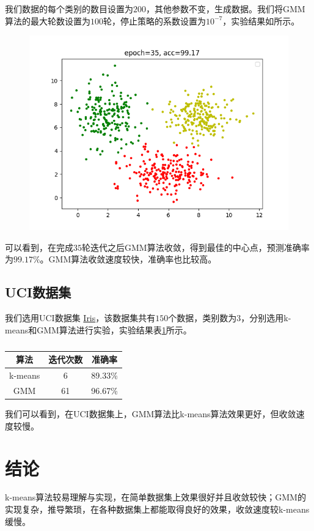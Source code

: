 \documentclass[lang=cn,11pt,a4paper,cite=authoryear]{elegantpaper}
\begin{document}
我们数据的每个类别的数目设置为$200$，其他参数不变，生成数据。我们将GMM算法的最大轮数设置为$100$轮，停止策略的系数设置为$10^{-7}$，实验结果如所示。

\begin{figure}[h]
	\centering
	\includegraphics[width=0.7\linewidth]{images/ml_lab3_3.png}
	\caption{}
	\label{fig:mllab33}
\end{figure}

可以看到，在完成$35$轮迭代之后GMM算法收敛，得到最佳的中心点，预测准确率为$99.17\%$。GMM算法收敛速度较快，准确率也比较高。

\subsection{UCI数据集}

我们选用UCI数据集 \href{http://archive.ics.uci.edu/ml/datasets/Iris}{Iris}，该数据集共有$150$个数据，类别数为$3$，分别选用k-means和GMM算法进行实验，实验结果表\ref{table:1}所示。

\begin{table}[h]
	\centering
	\begin{tabular}{ccc}
		\textbf{算法} & \textbf{迭代次数} & \textbf{准确率} \\ \hline
		k-means & 6 & 89.33\% \\
		GMM & 61 & 96.67\%
	\end{tabular}
	\caption{}
	\label{table:1}
\end{table}

我们可以看到，在UCI数据集上，GMM算法比k-means算法效果更好，但收敛速度较慢。


\section{结论}

k-means算法较易理解与实现，在简单数据集上效果很好并且收敛较快；GMM的实现复杂，推导繁琐，在各种数据集上都能取得良好的效果，收敛速度较k-means缓慢。
\end{document}
